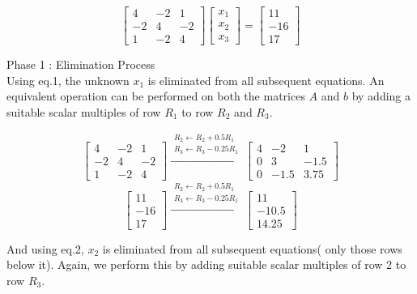 	\[ \begin{bmatrix} 4 & -2 & 1 \\ -2 & 4 & -2 \\ 1 & -2 & 4 \end{bmatrix} \begin{bmatrix} x_1 \\ x_2 \\ x_3 \end{bmatrix} = \begin{bmatrix} 11 \\ -16 \\ 17 \end{bmatrix} \]

	Phase 1 : Elimination Process\\

	Using eq.1, the unknown $x_1$ is eliminated from all subsequent equations. An equivalent operation can be performed on both the matrices $A$ and $b$ by adding a suitable scalar multiples of row $R_1$ to row $R_2$ and $R_3$. 

	\[ \begin{bmatrix} 4 & -2 & 1 \\ -2 & 4 & -2 \\ 1 & -2 & 4 \end{bmatrix} \xrightarrow{\substack{R_2 \leftarrow R_2 + 0.5R_1\\ R_3 \leftarrow R_3 - 0.25R_1}} \begin{bmatrix} 4 & -2 & 1 \\ 0 & 3 & -1.5 \\ 0 & -1.5 & 3.75 \end{bmatrix}\]
	\[ \begin{bmatrix} 11 \\ -16 \\ 17 \end{bmatrix} \xrightarrow{\substack{R_2 \leftarrow R_2 + 0.5R_1 \\ R_3 \leftarrow R_3 - 0.25R_1}} \begin{bmatrix} 11 \\ -10.5 \\ 14.25 \end{bmatrix} \]

	And using eq.2, $x_2$ is eliminated from all subsequent equations( only those rows below it). Again, we perform this by adding suitable scalar multiples of row 2 to row $R_3$.

